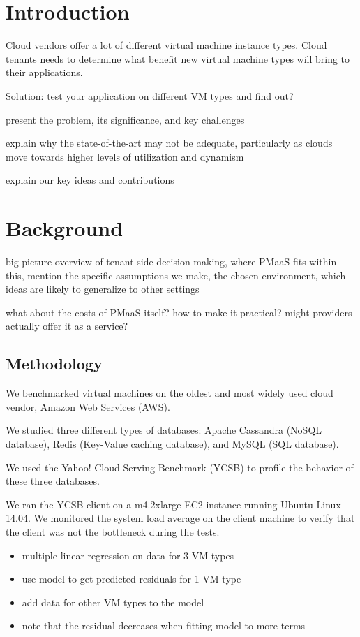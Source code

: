 \documentclass{acm_proc_article-sp}
\begin{document}

\section{Introduction}

Cloud vendors offer a lot of different virtual machine instance types. Cloud tenants needs to determine what benefit new virtual machine types will bring to their applications.

Solution: test your application on different VM types and find out?

present the problem, its significance, and key challenges
 
explain why the state-of-the-art may not be adequate, particularly as clouds move towards higher levels of utilization and dynamism

explain our key ideas and contributions

\section{Background}
big picture overview of tenant-side decision-making, where PMaaS fits within this, mention the specific assumptions we make, the chosen environment, which ideas are likely to generalize to other settings
 
what about the costs of PMaaS itself? how to make it practical? might providers actually offer it as a service?

\subsection{Methodology}

We benchmarked virtual machines on the oldest and most widely used cloud vendor, Amazon Web Services (AWS).

We studied three different types of databases: Apache Cassandra (NoSQL database), Redis (Key-Value caching database), and MySQL (SQL database).

We used the Yahoo! Cloud Serving Benchmark (YCSB) to profile the behavior of these three databases.

We ran the YCSB client on a m4.2xlarge EC2 instance running Ubuntu Linux 14.04. We monitored the system load average on the client machine to verify that the client was not the bottleneck during the tests.

\begin{itemize}
\item multiple linear regression on data for 3 VM types
\item use model to get predicted residuals for 1 VM type
\item add data for other VM types to the model
\item note that the residual decreases when fitting model to more terms
\end{itemize}
\end{document}
